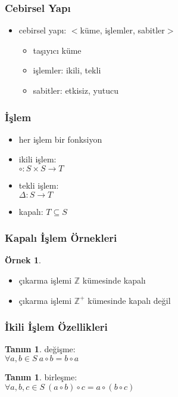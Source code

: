 \documentclass[dvipsnames]{beamer}
\theoremstyle{definition}
\newtheorem{tanim}[theorem]{Tanım}
\theoremstyle{example}
\newtheorem{ornek}[theorem]{Örnek}
\theoremstyle{plain}
\begin{document}
\begin{frame}
  \frametitle{Cebirsel Yapı}

  \begin{itemize}
    \item \alert{cebirsel yapı}: $<$küme, işlemler, sabitler$>$
    \begin{itemize}
      \item taşıyıcı küme
      \item işlemler: ikili, tekli
      \item sabitler: etkisiz, yutucu
    \end{itemize}
  \end{itemize}
\end{frame}

\begin{frame}
  \frametitle{İşlem}

  \begin{itemize}
    \item her işlem bir fonksiyon

    \medskip
    \item ikili işlem:\\
      $\circ: S \times S \rightarrow T$

    \medskip
    \item tekli işlem:\\
      $\Delta: S \rightarrow T$

    \pause
    \medskip
    \item \alert{kapalı}: $T \subseteq S$
  \end{itemize}
\end{frame}

\begin{frame}
  \frametitle{Kapalı İşlem Örnekleri}

  \begin{ornek}
    \begin{itemize}
      \item çıkarma işlemi $\mathbb{Z}$ kümesinde kapalı

      \pause
      \item çıkarma işlemi $\mathbb{Z^+}$ kümesinde kapalı değil
    \end{itemize}
  \end{ornek}
\end{frame}

\begin{frame}
  \frametitle{İkili İşlem Özellikleri}

  \begin{tanim}
    \alert{değişme}:\\
    $\forall a,b \in S~a \circ b = b \circ a$
  \end{tanim}

  \begin{tanim}
    \alert{birleşme}:\\
    $\forall a,b,c \in S~(a \circ b) \circ c = a \circ (b \circ c)$
  \end{tanim}
\end{frame}
\end{document}

